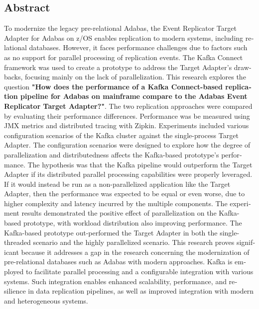 

\begin{otherlanguage}{american}
	\chapter*{Abstract}
	To modernize the legacy pre-relational Adabas, the Event Replicator Target Adapter for Adabas on z/OS enables replication to modern systems, including relational databases. However, it faces performance challenges due to factors such as no support for parallel processing of replication events. The Kafka Connect framework was used to create a prototype to address the Target Adapter's drawbacks, focusing mainly on the lack of parallelization. This research explores the question \textbf{"How does the performance of a Kafka Connect-based replication pipeline for Adabas on mainframe compare to the Adabas Event Replicator Target Adapter?"}. The two replication approaches were compared by evaluating their performance differences. Performance was be measured using JMX metrics and distributed tracing with Zipkin. Experiments included various configuration scenarios of the Kafka cluster against the single-process Target Adapter. The configuration scenarios were designed to explore how the degree of parallelization and distributedness affects the Kafka-based prototype's performance.
    The hypothesis was that the Kafka pipeline would outperform the Target Adapter if its distributed parallel processing capabilities were properly leveraged. If it would instead be run as a non-parallelized application like the Target Adapter, then the performance was expected to be equal or even worse, due to higher complexity and latency incurred by the multiple components.
    The experiment results demonstrated the positive effect of parallelization on the Kafka-based prototype, with workload distribution also improving performance. The Kafka-based prototype out-performed the Target Adapter in both the single-threaded scenario and the highly parallelized scenario.
    This research proves significant because it addresses a gap in the research concerning the modernization of pre-relational databases such as Adabas with modern approaches. Kafka is employed to facilitate parallel processing and a configurable integration with various systems. Such integration enables enhanced scalability, performance, and resilience in data replication pipelines, as well as improved integration with modern and heterogeneous systems.
\end{otherlanguage}
